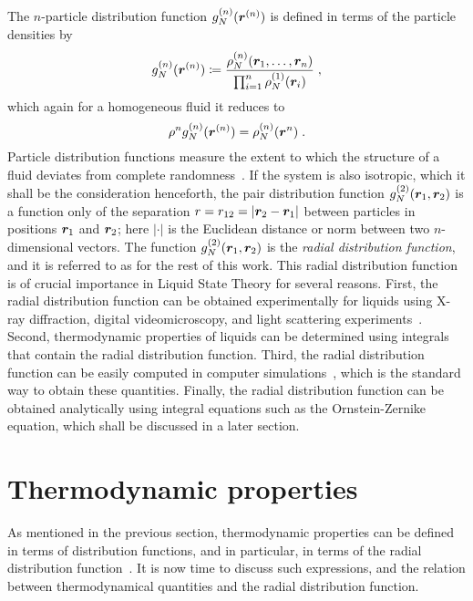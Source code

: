 The $n$-particle distribution function $g^{(n)}_{N} (\bm{r}^{(n)})$ is defined in terms
of the particle densities by
\begin{equation}
    g^{(n)}_{N} (\bm{r}^{(n)}) \coloneqq \frac{\rho^{(n)}_{N} (\bm{r}_{1}, \dots , \bm{r}_{n})}
    {\prod_{i=1}^{n} \rho^{(1)}_{N} (\bm{r}_{i})} \; ,
    \label{eq:gr-def}
\end{equation}
which again for a homogeneous fluid it reduces to
\begin{equation}
    \rho^{n} g^{(n)}_{N} (\bm{r}^{(n)}) = \rho^{(n)}_{N} (\bm{r}^{n}) \; .
    \label{eq:homogenous-gr}
\end{equation}
Particle distribution functions measure the extent to which the structure of a fluid 
deviates from complete randomness~\cite{hansenTheorySimpleLiquids2013}.
If the system is also isotropic, which it shall be the consideration henceforth,
the pair distribution function $g^{(2)}_{N} (\bm{r}_{1}, \bm{r}_{2})$ is a function only
of the separation $r = r_{12} = \lvert \bm{r}_{2} - \bm{r}_{1} \rvert$ between particles
in positions $\bm{r}_{1}$ and $\bm{r}_{2}$; here $\lvert \cdot \rvert$ is the Euclidean
distance or norm between two $n$-dimensional vectors.
The function $g^{(2)}_{N} (\bm{r}_{1}, \bm{r}_{2})$ is the
\emph{radial distribution function}, and it is referred to as 
\rdf for the rest of this work.
This radial distribution function is of crucial importance in Liquid State Theory for
several reasons. First, the radial distribution function can be obtained experimentally
for liquids using X-ray diffraction, digital videomicroscopy, and light scattering
experiments~\cite{mcquarrieStatisticalMechanics2000}.
Second, thermodynamic properties of liquids can be determined using integrals that
contain the radial distribution function. Third, the radial distribution function can
be easily computed in computer simulations~\cite{allenComputerSimulationLiquids2017}, 
which is the standard way to obtain these quantities. Finally, the radial distribution
function can be obtained analytically using integral equations such as the Ornstein-Zernike
equation, which shall be discussed in a later section.

\section{Thermodynamic properties} \label{sec:thermodynamics}
As mentioned in the previous section, thermodynamic properties can be defined in terms of
distribution functions, and in particular, in terms of the radial distribution
function~\cite{hansenTheorySimpleLiquids2013}.
It is now time to discuss such expressions, and the relation between thermodynamical
quantities and the radial distribution function.

